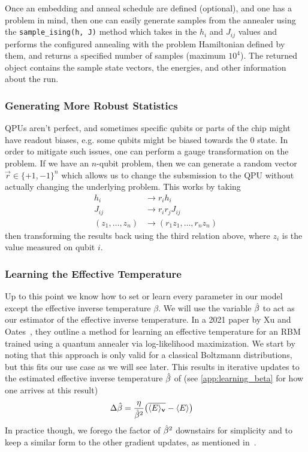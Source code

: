 Once an embedding and anneal schedule are defined (optional), and one has a problem in mind, then one can easily generate samples from the annealer using the \texttt{sample\_ising(h, J)} method which takes in the \( h_i \) and \( J_{ij} \) values and performs the configured annealing with the problem Hamiltonian defined by them, and returns a specified number of samples (maximum \( 10^4 \)).
The returned object contains the sample state vectors, the energies, and other information about the run.

\subsubsection{Generating More Robust Statistics}
QPUs aren't perfect, and sometimes specific qubits or parts of the chip might have readout biases, e.g. some qubits might be biased towards the 0 state.
In order to mitigate such issues, one can perform a gauge transformation on the problem.
If we have an \( n \)-qubit problem, then we can generate a random vector \( \vec{r} \in \{+1, -1\}^n \) which allows us to change the subsmission to the QPU without actually changing the underlying problem.
This works by taking
\begin{align}
    h_i
        &\rightarrow r_i h_i \\
    J_{ij}
        &\rightarrow r_i r_j J_{ij} \\
    (z_1, \dots, z_n)
        &\rightarrow (r_1 z_1, \dots, r_n z_n)
\end{align}
then transforming the results back using the third relation above, where \( z_i \) is the value measured on qubit \( i \).

\subsubsection{Learning the Effective Temperature}
Up to this point we know how to set or learn every parameter in our model except the effective inverse temperature \( \beta \).
We will use the variable \( \hat{\beta} \) to act as our estimator of the effective inverse temperature.
In a 2021 paper by Xu and Oates~\cite{xu_2021}, they outline a method for learning an effective temperature for an RBM trained using a quantum annealer via log-likelihood maximization.
We start by noting that this approach is only valid for a classical Boltzmann distributions, but this fits our use case as we will see later.
This results in iterative updates to the estimated effective inverse temperature \( \hat{\beta} \) of (see \cref{app:learning_beta} for how one arrives at this result)
\begin{align}
    \Delta\hat{\beta}
        &= \frac{\eta}{\hat{\beta}^2}\big(\overline{\langle E \rangle_{\mathbf{v}}} - \langle E \rangle\big)
\end{align}
In practice though, we forego the factor of \( \hat{\beta}^2 \) downstairs for simplicity and to keep a similar form to the other gradient updates, as mentioned in~\cite{xu_2021}.

